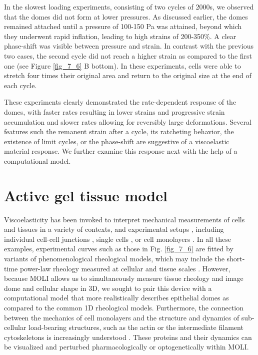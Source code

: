 In the slowest loading experiments, consisting of two cycles of 2000s, we observed that the domes did not form at lower pressures. As discussed earlier, the domes remained attached until a pressure of 100-150 Pa was attained, beyond which they underwent rapid inflation, leading to high strains of 200-350\%. A clear phase-shift was visible between pressure and strain. In contrast with the previous two cases, the second cycle did not reach a higher strain as compared to the first one (see Figure \ref{fig_7_6} B bottom). In these experiments, cells were able to stretch four times their original area and return to the original size at the end of each cycle.


These experiments clearly demonstrated the rate-dependent response of the domes, with faster rates resulting in lower strains and progressive strain accumulation and slower rates allowing for reversibly large deformations. Several features such the remanent strain after a cycle, its ratcheting behavior, the existence of limit cycles, or the phase-shift are suggestive of a viscoelastic material response. We further examine this response next with the help of a computational model.





\hypertarget{active-gel-tissue-model}{%
	\section{Active gel tissue model}\label{active-gel-tissue-model}}


Viscoelasticity has been invoked to interpret mechanical measurements of cells and tissues in a variety of contexts, and experimental setups \cite{PULLARKAT200729}, including individual cell-cell junctions \cite{clement2017}, single cells \cite{PhysRevLett.94.098103,Fischer-Friedrich:2016aa}, or cell monolayers \cite{Fernandez_2007,khalilgharibi2019}. In all these examples, experimental curves such as those in Fig. \ref{fig_7_6} are fitted by variants of phenomenological rheological models, which may include the short-time power-law rheology measured at cellular and tissue scales   \cite{PULLARKAT200729,doi:10.1098/rsos.190920,khalilgharibi2019}. However, because MOLI allows us to simultaneously measure tissue rheology and image dome and cellular shape in 3D, we sought to pair this device with a computational model that more realistically describes epithelial domes as compared to the common 1D rheological models. Furthermore, the connection between the mechanics of cell monolayers and the structure and dynamics of sub-cellular load-bearing structures, such as the actin or the intermediate filament cytoskeletons is increasingly understood \cite{latorre2018,khalilgharibi2019,duque2023}. These proteins and their dynamics can be visualized and perturbed pharmacologically or optogenetically within MOLI.

